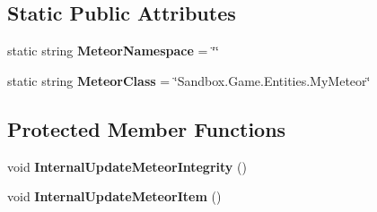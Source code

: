 \subsection*{Static Public Attributes}
\begin{DoxyCompactItemize}
\item 
\hypertarget{class_s_e_mod_a_p_i_internal_1_1_a_p_i_1_1_entity_1_1_sector_1_1_sector_object_1_1_meteor_a8d662bbd431f3eeba676394a9191895c}{}static string {\bfseries Meteor\+Namespace} = \char`\"{}\char`\"{}\label{class_s_e_mod_a_p_i_internal_1_1_a_p_i_1_1_entity_1_1_sector_1_1_sector_object_1_1_meteor_a8d662bbd431f3eeba676394a9191895c}

\item 
\hypertarget{class_s_e_mod_a_p_i_internal_1_1_a_p_i_1_1_entity_1_1_sector_1_1_sector_object_1_1_meteor_a0c80c4e5cd97a2a1a463156f8cb1608d}{}static string {\bfseries Meteor\+Class} = \char`\"{}Sandbox.\+Game.\+Entities.\+My\+Meteor\char`\"{}\label{class_s_e_mod_a_p_i_internal_1_1_a_p_i_1_1_entity_1_1_sector_1_1_sector_object_1_1_meteor_a0c80c4e5cd97a2a1a463156f8cb1608d}

\end{DoxyCompactItemize}
\subsection*{Protected Member Functions}
\begin{DoxyCompactItemize}
\item 
\hypertarget{class_s_e_mod_a_p_i_internal_1_1_a_p_i_1_1_entity_1_1_sector_1_1_sector_object_1_1_meteor_a491c6fda41927a92774dad19b665577d}{}void {\bfseries Internal\+Update\+Meteor\+Integrity} ()\label{class_s_e_mod_a_p_i_internal_1_1_a_p_i_1_1_entity_1_1_sector_1_1_sector_object_1_1_meteor_a491c6fda41927a92774dad19b665577d}

\item 
\hypertarget{class_s_e_mod_a_p_i_internal_1_1_a_p_i_1_1_entity_1_1_sector_1_1_sector_object_1_1_meteor_a06d3fb990886c1f598f719874019be3a}{}void {\bfseries Internal\+Update\+Meteor\+Item} ()\label{class_s_e_mod_a_p_i_internal_1_1_a_p_i_1_1_entity_1_1_sector_1_1_sector_object_1_1_meteor_a06d3fb990886c1f598f719874019be3a}

\end{DoxyCompactItemize}
